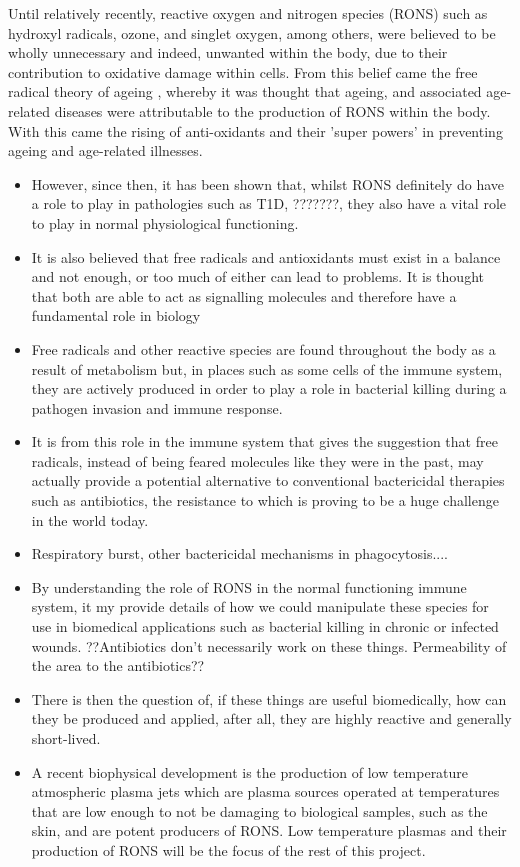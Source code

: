 \documentclass[11pt, oneside]{article}   	%
\begin{document}
Until relatively recently, reactive oxygen and nitrogen species (RONS) such as hydroxyl radicals, ozone, and singlet oxygen, among others, were believed to be wholly unnecessary and indeed, unwanted within the body, due to their contribution to oxidative damage within cells.
From this belief came the free radical theory of ageing \cite{Harman1955}, whereby it was thought that ageing, and associated age-related diseases were attributable to the production of RONS within the body.
With this came the rising of anti-oxidants and their 'super powers' in preventing ageing and age-related illnesses.
\begin{itemize}
\item However, since then, it has been shown that, whilst RONS definitely do have a role to play in pathologies such as T1D, ???????, they also have a vital role to play in normal physiological functioning.
\item It is also believed that free radicals and antioxidants must exist in a balance and not enough, or too much of either can lead to problems. It is thought that both are able to act as signalling molecules and therefore have a fundamental role in biology
\item Free radicals and other reactive species are found throughout the body as a result of metabolism but, in places such as some cells of the immune system, they are actively produced in order to play a role in bacterial killing during a pathogen invasion and immune response.
\item It is from this role in the immune system that gives the suggestion that free radicals, instead of being feared molecules like they were in the past, may actually provide a potential alternative to conventional bactericidal therapies such as antibiotics, the resistance to which is proving to be a huge challenge in the world today.

\item Respiratory burst, other bactericidal mechanisms in phagocytosis....
\item By understanding the role of RONS in the normal functioning immune system, it my provide details of how we could manipulate these species for use in biomedical applications such as bacterial killing in chronic or infected wounds. ??Antibiotics don't necessarily work on these things. Permeability of the area to the antibiotics??

\item There is then the question of, if these things are useful biomedically, how can they be produced and applied, after all, they are highly reactive and generally short-lived.
\item A recent biophysical development is the production of low temperature atmospheric plasma jets which are plasma sources operated at temperatures that are low enough to not be damaging to biological samples, such as the skin, and are potent producers of RONS. 
Low temperature plasmas and their production of RONS will be the focus of the rest of this project.
\end{itemize}
\end{document}
